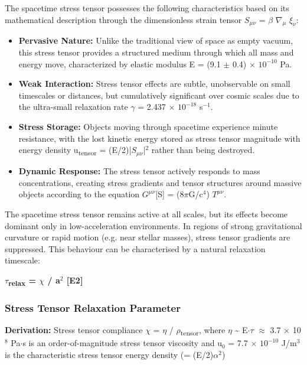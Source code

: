 \documentclass[11pt,a4paper]{article}
\begin{document}
The spacetime stress tensor possesses the following characteristics based on its mathematical description through the dimensionless strain tensor $S_{\mu\nu}$ = $\beta$ $\nabla_\mu$ $\xi_\nu$:

\begin{itemize}
  \item \textbf{Pervasive Nature:} Unlike the traditional view of space as empty vacuum, this stress tensor provides a structured medium through which all mass and energy move, characterized by elastic modulus E = (9.1 $\pm$ 0.4) $\times$ $10^{-10}$ Pa.
  \item \textbf{Weak Interaction:} Stress tensor effects are subtle, unobservable on small timescales or distances, but cumulatively significant over cosmic scales due to the ultra-small relaxation rate $\gamma$ = 2.437 $\times$ $10^{-18}$ s$^{-1}$.
  \item \textbf{Stress Storage:} Objects moving through spacetime experience minute resistance, with the lost kinetic energy stored as stress tensor magnitude with energy density u\textsubscript{tensor} = (E/\allowbreak{}2)|$S_{\mu\nu}$|$^{2}$ rather than being destroyed.
  \item \textbf{Dynamic Response:} The stress tensor actively responds to mass concentrations, creating stress gradients and tensor structures around massive objects according to the equation $G^{\mu\nu}$[S] = (8$\pi$G/\allowbreak{}c$^{4}$) $T^{\mu\nu}$.
\end{itemize}

The spacetime stress tensor remains active at all scales, but its effects become dominant only in low-acceleration environments. In regions of strong gravitational curvature or rapid motion (e.g. near stellar masses), stress tensor gradients are suppressed. This behaviour can be characterised by a natural relaxation timescale:

\textbf{$\tau$\textsubscript{relax} = $\chi$ / a$^{2}$ [E2]}

\begin{mdframed}[linecolor=accent,linewidth=0.5pt,backgroundcolor=callout-bg,leftline=true,rightline=true,topline=true,bottomline=true,innerleftmargin=8pt,innerrightmargin=8pt,innertopmargin=6pt,innerbottommargin=6pt]
\subsubsection{Stress Tensor Relaxation Parameter}
\textbf{Derivation:} Stress tensor compliance $\chi$ = $\eta$ / $\rho$\textsubscript{tensor}, where $\eta$ \~{} E$\cdot$$\tau$ $\approx$ 3.7 $\times$ 10$^{8}$ Pa$\cdot$s is an order-of-magnitude stress tensor viscosity and u$_{0}$ = 7.7 $\times$ $10^{-10}$ J/\allowbreak{}m$^{3}$ is the characteristic stress tensor energy density (= (E/\allowbreak{}2)$\alpha$$^{2}$)
\end{mdframed}
\end{document}

